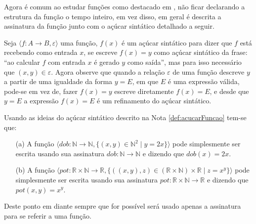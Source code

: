 Agora é comum ao estudar funções como destacado em \cite{carmo2013}, não ficar declarando a estrutura da função o tempo inteiro, em vez disso, em geral é descrita a assinatura da função junto com o açúcar sintático detalhado a seguir.

\begin{note}\label{def:acucarFuncao}
	Seja  $\langle f: A \rightarrow B, \varepsilon \rangle$ uma função, $f(x)$ é um açúcar sintático para dizer que $f$ está recebendo como entrada $x$, se escreve $f(x) = y$ como açúcar sintático da frase: ``ao calcular $f$ com entrada $x$ é gerado $y$ como saída'', mas para isso necessário que $(x, y) \in \varepsilon$. Agora observe que quando a relação $\varepsilon$ de uma função descreve $y$ a partir de uma igualdade da forma $y = E$, em que $E$ é uma expressão válida, pode-se em vez de, fazer $f(x) = y$ escreve diretamente $f(x) = E$, e desde que $y = E$ a expressão $f(x) = E$ é um refinamento do açúcar sintático.
\end{note}

\begin{example}
	Usando as ideias do açúcar sintático descrito na Nota \ref{def:acucarFuncao} tem-se que:
	\begin{itemize}
		\item[(a)] A função  $\langle dob: \mathbb{N} \rightarrow  \mathbb{N},  \{(x, y) \in \mathbb{N}^2 \mid  y = 2x\} \rangle$ pode simplesmente ser escrita usando sua assinatura $dob:\mathbb{N} \rightarrow  \mathbb{N}$ e dizendo que $dob(x) = 2x$.
		\item[(b)] A função  $\langle pot: \mathbb{R} \times \mathbb{N} \rightarrow  \mathbb{R},  \{((x, y), z) \in (\mathbb{R} \times \mathbb{N}) \times \mathbb{R} \mid  z = x^y\} \rangle$ pode simplesmente ser escrita usando sua assinatura $pot: \mathbb{R} \times \mathbb{N} \rightarrow  \mathbb{R}$ e dizendo que $pot(x, y) = x^y$.
	\end{itemize}
\end{example}

\begin{remark}
	Deste ponto em diante sempre que for possível será usado apenas a assinatura para se referir a uma função.
\end{remark}

